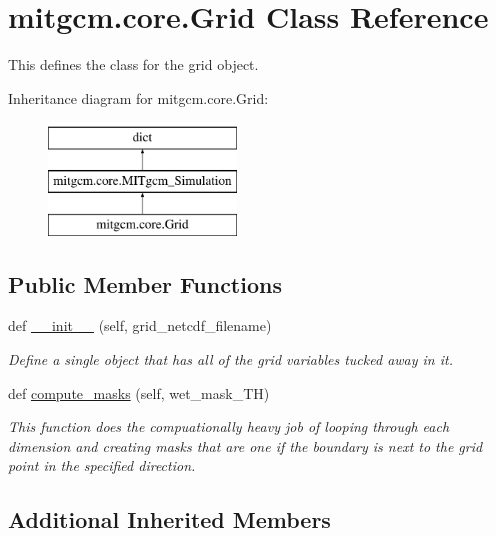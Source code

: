 \hypertarget{classmitgcm_1_1core_1_1Grid}{}\section{mitgcm.\+core.\+Grid Class Reference}
\label{classmitgcm_1_1core_1_1Grid}


This defines the class for the grid object.  


Inheritance diagram for mitgcm.\+core.\+Grid\+:\begin{figure}[H]
\begin{center}
\leavevmode
\includegraphics[height=3.000000cm]{classmitgcm_1_1core_1_1Grid}
\end{center}
\end{figure}
\subsection*{Public Member Functions}
\begin{DoxyCompactItemize}
\item 
def \hyperlink{classmitgcm_1_1core_1_1Grid_a79af97fd15b63db33ac352236168d38b}{\+\_\+\+\_\+init\+\_\+\+\_\+} (self, grid\+\_\+netcdf\+\_\+filename)
\begin{DoxyCompactList}\small\item\em Define a single object that has all of the grid variables tucked away in it. \end{DoxyCompactList}\item 
def \hyperlink{classmitgcm_1_1core_1_1Grid_ad33f3e78699330079c7ae7dfbd5d7adb}{compute\+\_\+masks} (self, wet\+\_\+mask\+\_\+\+T\+H)
\begin{DoxyCompactList}\small\item\em This function does the compuationally heavy job of looping through each dimension and creating masks that are one if the boundary is next to the grid point in the specified direction. \end{DoxyCompactList}\end{DoxyCompactItemize}
\subsection*{Additional Inherited Members}


